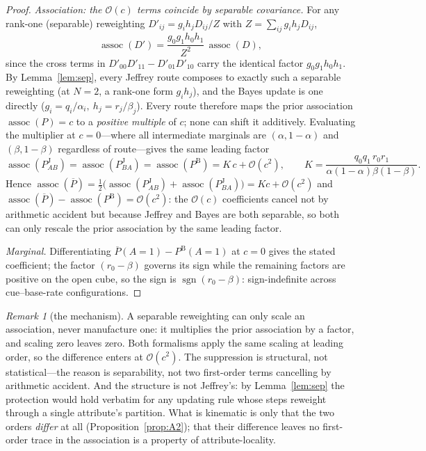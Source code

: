 \documentclass[review,12pt,authoryear]{elsarticle}
\theoremstyle{remark}
\newtheorem{remark}{Remark}
\theoremstyle{definition}
\newcommand{\PB}{P^{\mathrm{B}}}
\newcommand{\PJ}{P^{\mathrm{J}}}
\newcommand{\Pbar}{\overline{P}}
\newcommand{\assoc}{\operatorname{assoc}}
\newcommand{\sgn}{\operatorname{sgn}}
\newcommand{\bigO}{\mathcal{O}}
\newcommand{\anchor}[1]{}
\begin{document}
\begin{proof}
\emph{Association: the $\bigO(c)$ terms coincide by separable covariance.} For any rank-one
(separable) reweighting $D'_{ij}=g_i h_j D_{ij}/Z$ with $Z=\sum_{ij}g_i h_j D_{ij}$,
\[
  \assoc(D')=\frac{g_0 g_1 h_0 h_1}{Z^{2}}\,\assoc(D),
\]
since the cross terms in $D'_{00}D'_{11}-D'_{01}D'_{10}$ carry the identical factor
$g_0g_1h_0h_1$. By Lemma~\ref{lem:sep}, every Jeffrey route composes to exactly such a
separable reweighting (at $N=2$, a rank-one form $g_ih_j$), and the Bayes update is one
directly ($g_i=q_i/\alpha_i,\ h_j=r_j/\beta_j$). Every route therefore
maps the prior association $\assoc(P)=c$ to a \emph{positive multiple} of $c$; none can shift it
additively. Evaluating the multiplier at $c=0$---where all intermediate marginals are
$(\alpha,1-\alpha)$ and $(\beta,1-\beta)$ regardless of route---gives the same leading factor
\[
  \assoc(\PJ_{AB})=\assoc(\PJ_{BA})=\assoc(\PB)=K\,c+\bigO(c^2),
  \qquad K=\frac{q_0 q_1\, r_0 r_1}{\alpha(1-\alpha)\beta(1-\beta)} .
\]
Hence $\assoc(\Pbar)=\tfrac12\big(\assoc(\PJ_{AB})+\assoc(\PJ_{BA})\big)=Kc+\bigO(c^2)$ and
$\assoc(\Pbar)-\assoc(\PB)=\bigO(c^2)$: the $\bigO(c)$ coefficients cancel not by arithmetic
accident but because Jeffrey and Bayes are both separable, so both can only rescale the prior
association by the same leading factor.

\emph{Marginal.} Differentiating $\Pbar(A{=}1)-\PB(A{=}1)$ at $c=0$ gives the stated
coefficient; the factor $(r_0-\beta)$ governs its sign while the remaining factors are positive
on the open cube, so the sign is $\sgn(r_0-\beta)$: sign-indefinite across cue--base-rate
configurations.
\end{proof}

\begin{remark}[the mechanism]\label{rem:mechanism}
A separable reweighting can only scale an association, never manufacture one: it multiplies the
prior association by a factor, and scaling zero leaves zero. Both formalisms apply the same
scaling at leading order, so the difference enters at $\bigO(c^{2})$. The suppression is
structural, not statistical---the reason is separability, not two first-order terms cancelling
by arithmetic accident. And the structure is not Jeffrey's: by Lemma~\ref{lem:sep} the
protection would hold verbatim for any updating rule whose steps reweight through a single
attribute's partition. What is kinematic is only that the two orders \emph{differ} at all
(Proposition~\ref{prop:A2}); that their difference leaves no first-order trace in the
association is a property of attribute-locality. \anchor{Prop.~C1}
\end{remark}
\end{document}
